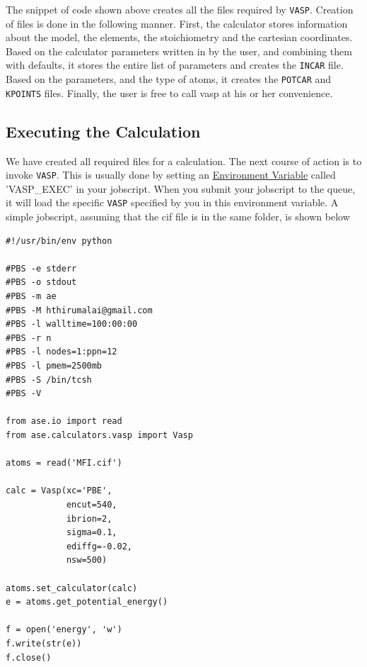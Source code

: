 \documentclass[11pt]{article}
\begin{document}
The snippet of code shown above creates all the files required by \texttt{VASP}. Creation of files is done in the following manner. First, the calculator stores information about the model, the elements, the stoichiometry and the cartesian coordinates. Based on the calculator parameters written in by the user, and combining them with defaults, it stores the entire list of parameters and creates the \texttt{INCAR} file. Based on the parameters, and the type of atoms, it creates the \texttt{POTCAR} and \texttt{KPOINTS} files. Finally, the user is free to call vasp at his or her convenience. 

\subsection{Executing the Calculation}
\label{sec-6-3}
We have created all required files for a calculation. The next course of action is to invoke \texttt{VASP}. This is usually done by setting an \href{https://en.wikipedia.org/wiki/Environment_variable}{Environment Variable} called 'VASP\_EXEC' in your jobscript. When you submit your jobscript to the queue, it will load the specific \texttt{VASP} specified by you in this environment variable. A simple jobscript, assuming that the cif file is in the same folder, is shown below

\begin{verbatim}
#!/usr/bin/env python

#PBS -e stderr
#PBS -o stdout
#PBS -m ae
#PBS -M hthirumalai@gmail.com
#PBS -l walltime=100:00:00
#PBS -r n
#PBS -l nodes=1:ppn=12
#PBS -l pmem=2500mb
#PBS -S /bin/tcsh
#PBS -V

from ase.io import read
from ase.calculators.vasp import Vasp

atoms = read('MFI.cif')

calc = Vasp(xc='PBE',
            encut=540,
            ibrion=2,
            sigma=0.1,
            ediffg=-0.02,
            nsw=500)

atoms.set_calculator(calc)
e = atoms.get_potential_energy()

f = open('energy', 'w')
f.write(str(e))
f.close()
\end{verbatim}
\end{document}
